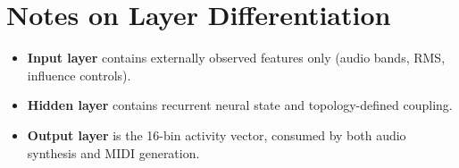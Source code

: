 \documentclass[11pt,a4paper]{article}
\begin{document}
\section{Notes on Layer Differentiation}

\begin{itemize}
    \item \textbf{Input layer} contains externally observed features only (audio bands, RMS, influence controls).
    \item \textbf{Hidden layer} contains recurrent neural state and topology-defined coupling.
    \item \textbf{Output layer} is the 16-bin activity vector, consumed by both audio synthesis and MIDI generation.
\end{itemize}
\end{document}
